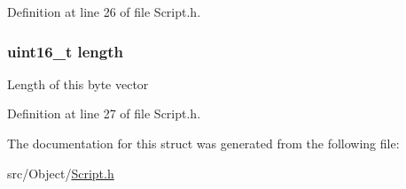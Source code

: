 Definition at line 26 of file Script.h.

\hypertarget{struct_script_byte_vector_a1892eba2086d12ac2b09005aeb09ea3b}{
\subsubsection[{length}]{\setlength{\rightskip}{0pt plus 5cm}uint16\_\-t {\bf length}}}
\label{struct_script_byte_vector_a1892eba2086d12ac2b09005aeb09ea3b}
Length of this byte vector 

Definition at line 27 of file Script.h.



The documentation for this struct was generated from the following file:\begin{DoxyCompactItemize}
\item 
src/Object/\hyperlink{_script_8h}{Script.h}\end{DoxyCompactItemize}
